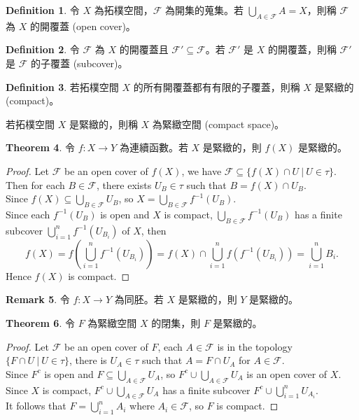 \documentclass[12pt]{article}
\theoremstyle{definition}
\newtheorem{definition}{Definition}[section]
\newtheorem{theorem}[definition]{Theorem}
\newtheorem{remark}[definition]{Remark}
\newcommand\<{\langle}
\renewcommand\>{\rangle}
\begin{document}
\begin{CJK}{UTF8}{bsmi}
\begin{definition}
    令 $X$ 為拓樸空間，$\mathcal{F}$ 為開集的蒐集。若 $\bigcup_{A\in\mathcal{F}}A=X$，則稱 $\mathcal{F}$ 為 $X$ 的開覆蓋 (open cover)。
\end{definition}

\begin{definition}
    令 $\mathcal{F}$ 為 $X$ 的開覆蓋且 $\mathcal{F}'\subseteq\mathcal{F}$。若 $\mathcal{F}'$ 是 $X$ 的開覆蓋，則稱 $\mathcal{F}'$ 是 $\mathcal{F}$ 的子覆蓋 (subcover)。
\end{definition}

\begin{definition}
    若拓樸空間 $X$ 的所有開覆蓋都有有限的子覆蓋，則稱 $X$ 是緊緻的 (compact)。
\end{definition}

若拓樸空間 $X$ 是緊緻的，則稱 $X$ 為緊緻空間 (compact space)。

\begin{theorem}
    令 $f:X\to Y$ 為連續函數。若 $X$ 是緊緻的，則 $f(X)$ 是緊緻的。
\end{theorem}
\begin{proof}
    Let $\mathcal{F}$ be an open cover of $f(X)$, we have $\mathcal{F}\subseteq\{f(X)\cap U\ |\ U\in\tau\}$. \\
    Then for each $B\in\mathcal{F}$, there exists $U_B\in\tau$ such that $B=f(X)\cap U_B$. \\
    Since $f(X)\subseteq\bigcup_{B\in\mathcal{F}}U_B$, so $X=\bigcup_{B\in\mathcal{F}}f^{-1}(U_B)$. \\
    Since each $f^{-1}(U_B)$ is open and $X$ is compact, $\bigcup_{B\in\mathcal{F}}f^{-1}(U_B)$ has a finite subcover $\bigcup_{i=1}^n f^{-1}(U_{B_i})$ of $X$, then
    \[
        f(X)=f\left(\bigcup_{i=1}^n f^{-1}(U_{B_i})\right)=f(X)\cap\bigcup_{i=1}^n f(f^{-1}(U_{B_i}))=\bigcup_{i=1}^n B_i.
    \]
    Hence $f(X)$ is compact.
\end{proof}

\begin{remark}
    令 $f:X\to Y$ 為同胚。若 $X$ 是緊緻的，則 $Y$ 是緊緻的。
\end{remark}

\begin{theorem}
    令 $F$ 為緊緻空間 $X$ 的閉集，則 $F$ 是緊緻的。
\end{theorem}
\begin{proof}
    Let $\mathcal{F}$ be an open cover of $F$, each $A\in\mathcal{F}$ is in the topology $\{F\cap U\ |\ U\in\tau\}$, there is $U_A\in\tau$ such that $A=F\cap U_A$ for $A\in\mathcal{F}$. \\
    Since $F^c$ is open and $F\subseteq\bigcup_{A\in\mathcal{F}} U_A$, so $F^c\cup\bigcup_{A\in\mathcal{F}} U_A$ is an open cover of $X$. \\
    Since $X$ is compact, $F^c\cup\bigcup_{A\in\mathcal{F}} U_A$ has a finite subcover $F^c\cup\bigcup_{i=1}^n U_{A_i}$. \\
    It follows that $F=\bigcup_{i=1}^n A_i$ where $A_i\in\mathcal{F}$, so $F$ is compact.
\end{proof}


\end{CJK}
\end{document}
